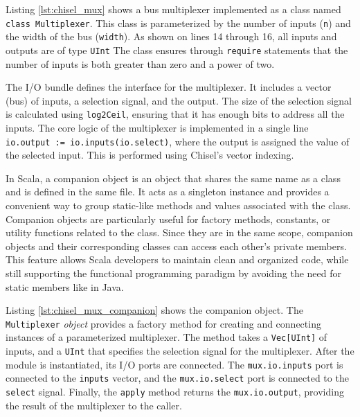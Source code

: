 {

Listing \ref{lst:chisel_mux} shows a bus multiplexer implemented as a class named \texttt{class Multiplexer}. This class is parameterized by the number of inputs (\texttt{n}) and the width of the bus (\texttt{width}). As shown on lines 14 through 16, all inputs and outputs are of type \texttt{UInt}  The class ensures through \texttt{require} statements that the number of inputs is both greater than zero and a power of two. 

The I/O bundle defines the interface for the multiplexer. It includes a vector (bus) of inputs, a selection signal, and the output. The size of the selection signal is calculated using \texttt{log2Ceil}, ensuring that it has enough bits to address all the inputs. The core logic of the multiplexer is implemented in a single line \texttt{io.output := io.inputs(io.select)}, where the output is assigned the value of the selected input. This is performed using Chisel’s vector indexing.

In Scala, a companion object is an object that shares the same name as a class and is defined in the same file. It acts as a singleton instance and provides a convenient way to group static-like methods and values associated with the class. Companion objects are particularly useful for factory methods, constants, or utility functions related to the class. Since they are in the same scope, companion objects and their corresponding classes can access each other's private members. This feature allows Scala developers to maintain clean and organized code, while still supporting the functional programming paradigm by avoiding the need for static members like in Java.


Listing \ref{lst:chisel_mux_companion} shows the companion object. The \texttt{Multiplexer} \textit{object} provides a factory method for creating and connecting instances of a parameterized multiplexer. The method takes a \texttt{Vec[UInt]} of inputs, and a \texttt{UInt} that specifies the selection signal for the multiplexer. After the module is instantiated, its I/O ports are connected. The \texttt{mux.io.inputs} port is connected to the \texttt{inputs} vector, and the \texttt{mux.io.select} port is connected to the \texttt{select} signal. Finally, the \texttt{apply} method returns the \texttt{mux.io.output}, providing the result of the multiplexer to the caller. 

}

